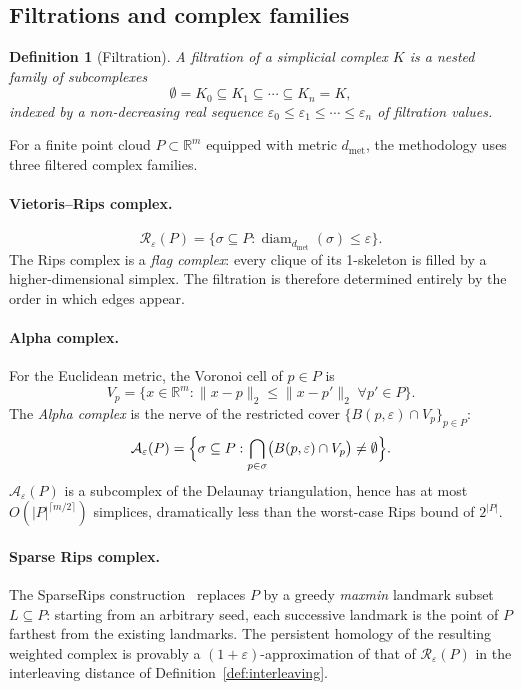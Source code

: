 \documentclass[onluarkali,ingilizce,yukseklisans,karton,LisansustuEgitim]{itutez}
\newtheorem{definition}{Definition}[chapter]
\DeclareMathOperator{\diam}{diam}
\providecommand{\R}{\mathbb{R}}
\providecommand{\1}{\mathbf{1}}
\begin{document}
\subsection{Filtrations and complex families}
\label{subsubsec:filtration}

\begin{definition}[Filtration]
\label{def:filtration}
A \emph{filtration} of a simplicial complex $K$ is a nested family of subcomplexes
\[
  \emptyset=K_0\subseteq K_1\subseteq\cdots\subseteq K_n=K,
\]
indexed by a non-decreasing real sequence $\varepsilon_0\leq\varepsilon_1\leq\cdots\leq\varepsilon_n$ of \emph{filtration values}.
\end{definition}

For a finite point cloud $P\subset\R^m$ equipped with metric $d_{\mathrm{met}}$, the methodology uses three filtered complex families.

\paragraph{Vietoris--Rips complex.}
\begin{equation}
  \mathcal{R}_\varepsilon(P)=\bigl\{\sigma\subseteq P:\diam_{d_{\mathrm{met}}}(\sigma)\leq\varepsilon\bigr\}.
  \label{eq:rips}
\end{equation}
The Rips complex is a \emph{flag complex}: every clique of its 1-skeleton is filled by a higher-dimensional simplex. The filtration is therefore determined entirely by the order in which edges appear.

\paragraph{Alpha complex.}
For the Euclidean metric, the Voronoi cell of $p\in P$ is
\[
  V_p=\bigl\{x\in\R^m:\|x-p\|_2\leq\|x-p'\|_2\;\forall p'\in P\bigr\}.
\]
The \emph{Alpha complex} is the nerve of the restricted cover $\{B(p,\varepsilon)\cap V_p\}_{p\in P}$:
\begin{equation}
  \mathcal{A}_\varepsilon(P)=\Bigl\{\sigma\subseteq P:\bigcap_{p\in\sigma}\bigl(B(p,\varepsilon)\cap V_p\bigr)\neq\emptyset\Bigr\}.
  \label{eq:alpha}
\end{equation}
$\mathcal{A}_\varepsilon(P)$ is a subcomplex of the Delaunay triangulation, hence has at most $O(|P|^{\lceil m/2\rceil})$ simplices, dramatically less than the worst-case Rips bound of $2^{|P|}$.

\paragraph{Sparse Rips complex.}
The SparseRips construction~\parencite{cavanna2015geometric} replaces $P$ by a greedy \emph{maxmin} landmark subset $L\subseteq P$: starting from an arbitrary seed, each successive landmark is the point of $P$ farthest from the existing landmarks. The persistent homology of the resulting weighted complex is provably a $(1+\varepsilon)$-approximation of that of $\mathcal{R}_\varepsilon(P)$ in the interleaving distance of Definition~\ref{def:interleaving}.
\end{document}
